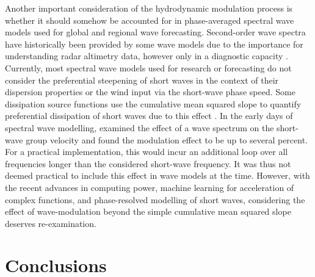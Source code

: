 \documentclass[lineno]{jfm}
\begin{document}
Another important consideration of the hydrodynamic modulation process is
whether it should somehow be accounted for in phase-averaged spectral wave
models \citep{group1988wam,tolman1991third,donelan2012modeling} used for global
and regional wave forecasting.
Second-order wave spectra have historically been provided by some wave models
due to the importance for understanding radar altimetry data, however only in a
diagnostic capacity \citep[e.g.,][]{janssen2009some}.
Currently, most spectral wave models used for research or forecasting
do not consider the preferential steepening of short waves in the context
of their dispersion properties or the wind input via the short-wave phase speed.
Some dissipation source functions use the cumulative mean squared slope
to quantify preferential dissipation of short waves due to this effect
\citep{donelan2012modeling,romero2019distribution}.
In the early days of spectral wave modelling, \citet{willebrand1975energy}
examined the effect of a wave spectrum on the short-wave group velocity
and found the modulation effect to be up to several percent.
For a practical implementation, this would incur an additional loop over all
frequencies longer than the considered short-wave frequency.
It was thus not deemed practical to include this effect in wave models at the
time.
However, with the recent advances in computing power, machine learning for
acceleration of complex functions, and phase-resolved modelling of short waves,
considering the effect of wave-modulation beyond the simple cumulative mean
squared slope deserves re-examination.

\section{Conclusions}
\label{section:conclusions}
\end{document}
